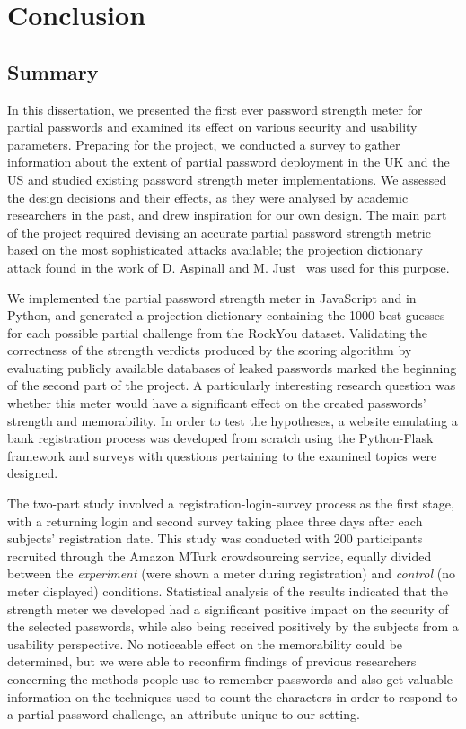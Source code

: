
\chapter{Conclusion}
\label{cha:conclusion}

  \section{Summary}
    \label{sec:summary}
    In this dissertation, we presented the first ever password strength meter for partial passwords and examined its effect on various security and usability parameters. Preparing for the project, we conducted a survey to gather information about the extent of partial password deployment in the UK and the US and studied existing password strength meter implementations. We assessed the design decisions and their effects, as they were analysed by academic researchers in the past, and drew inspiration for our own design. The main part of the project required devising an accurate partial password strength metric based on the most sophisticated attacks available; the projection dictionary attack found in the work of D. Aspinall and M. Just~\cite{part_pass} was used for this purpose.

    We implemented the partial password strength meter in JavaScript and in Python, and generated a projection dictionary containing the 1000 best guesses for each possible partial challenge from the RockYou dataset. Validating the correctness of the strength verdicts produced by the scoring algorithm by evaluating publicly available databases of leaked passwords marked the beginning of the second part of the project. A particularly interesting research question was whether this meter would have a significant effect on the created passwords' strength and memorability. In order to test the hypotheses, a website emulating a bank registration process was developed from scratch using the Python-Flask framework and surveys with questions pertaining to the examined topics were designed.

    The two-part study involved a registration-login-survey process as the first stage, with a returning login and second survey taking place three days after each subjects' registration date. This study was conducted with 200 participants recruited through the Amazon MTurk crowdsourcing service, equally divided between the \emph{experiment} (were shown a meter during registration) and \emph{control} (no meter displayed) conditions. Statistical analysis of the results indicated that the strength meter we developed had a significant positive impact on the security of the selected passwords, while also being received positively by the subjects from a usability perspective. No noticeable effect on the memorability could be determined, but we were able to reconfirm findings of previous researchers concerning the methods people use to remember passwords and also get valuable information on the techniques used to count the characters in order to respond to a partial password challenge, an attribute unique to our setting.


